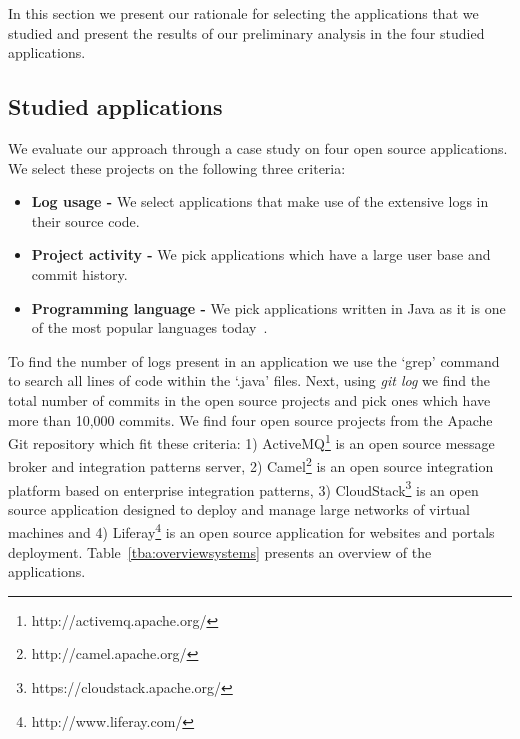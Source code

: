 
In this section we present our rationale for selecting the applications that we studied and present the results of our preliminary analysis in the four studied applications.

\subsection{Studied applications}
We evaluate our approach through a case study on four open source applications. We select these projects on the following three criteria:
\begin{itemize}
	\item \textbf{Log usage -} We select applications that make use of the extensive logs in their source code. 
	\item \textbf{Project activity -} We pick applications which have a large user base and commit history.
	\item \textbf{Programming language -} We pick applications written in Java as it is one of the most popular languages today~\cite{Javaprog}.
\end{itemize}




To find the number of logs present in an application we use the `grep' command to search all lines of code within the `.java' files. Next, using \emph{git log} we find the total number of commits in the open source projects and pick ones which have more than 10,000 commits. We find four open source projects from the Apache Git repository which fit these criteria: 1) ActiveMQ\footnote[1]{http://activemq.apache.org/} is an open source message broker and integration patterns server, 2) {Camel}\footnote[2]{http://camel.apache.org/} is an open source integration platform based on enterprise integration patterns, 3) {CloudStack}\footnote[3]{https://cloudstack.apache.org/} is an open source application designed to deploy and manage large networks of virtual machines and 4) {Liferay}\footnote[4]{http://www.liferay.com/} is an open source application for websites and portals deployment. Table~\ref{tba:overviewsystems} presents an overview of the applications. 


